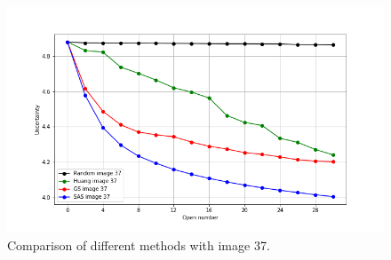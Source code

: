 \begin{figure}[h!]
	\hspace*{-1cm}
	\includegraphics[scale=0.55]{CNN-B-ADV_layer7_comparison_image37}
	\caption{Comparison of different methods with image 37.}
	\label{fig5}
\end{figure}



%

